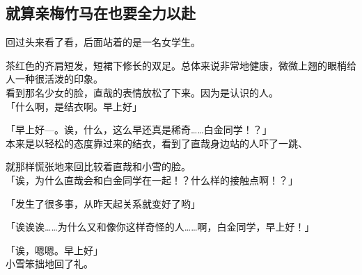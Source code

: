 \subsection{就算亲梅竹马在也要全力以赴}

回过头来看了看，后面站着的是一名女学生。

茶红色的齐肩短发，短裙下修长的双足。总体来说非常地健康，微微上翘的眼梢给人一种很活泼的印象。\\

看到那名少女的脸，直哉的表情放松了下来。因为是认识的人。\\

「什么啊，是结衣啊。早上好」

「早上好—。诶，什么，这么早还真是稀奇……白金同学！？」\\

本来是以轻松的态度靠过来的结衣，看到了直哉身边站的人吓了一跳、

就那样慌张地来回比较着直哉和小雪的脸。\\

「诶，为什么直哉会和白金同学在一起！？什么样的接触点啊！？」

「发生了很多事，从昨天起关系就变好了哟」

「诶诶诶……为什么又和像你这样奇怪的人……啊，白金同学，早上好！」

「诶，嗯嗯。早上好」\\

小雪笨拙地回了礼。


